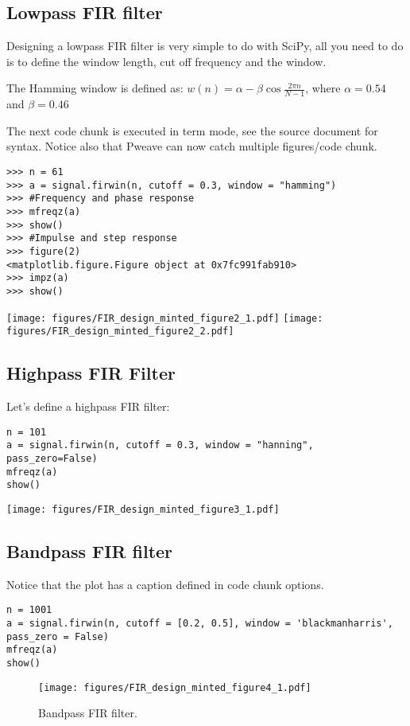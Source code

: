 \documentclass[a4paper,11pt,final]{article}
\begin{document}
\subsection{Lowpass FIR filter}

Designing a lowpass FIR filter is very simple to do with SciPy, all you
need to do is to define the window length, cut off frequency and the
window.

The Hamming window is defined as:
$w(n) = \alpha - \beta\cos\frac{2\pi n}{N-1}$, where $\alpha=0.54$ and
$\beta=0.46$

The next code chunk is executed in term mode, see the source document
for syntax. Notice also that Pweave can now catch multiple
figures/code chunk.


\begin{verbatim}
>>> n = 61
>>> a = signal.firwin(n, cutoff = 0.3, window = "hamming")
>>> #Frequency and phase response
>>> mfreqz(a)
>>> show()
>>> #Impulse and step response
>>> figure(2)
<matplotlib.figure.Figure object at 0x7fc991fab910>
>>> impz(a)
>>> show()

\end{verbatim}
\texttt{[image: figures/FIR\_design\_minted\_figure2\_1.pdf]}
\texttt{[image: figures/FIR\_design\_minted\_figure2\_2.pdf]}


\subsection{Highpass FIR Filter}

Let's define a highpass FIR filter:


\begin{verbatim}
n = 101
a = signal.firwin(n, cutoff = 0.3, window = "hanning",
pass_zero=False)
mfreqz(a)
show()
\end{verbatim}
\texttt{[image: figures/FIR\_design\_minted\_figure3\_1.pdf]}


\subsection{Bandpass FIR filter}

Notice that the plot has a caption defined in code chunk options.



\begin{verbatim}
n = 1001
a = signal.firwin(n, cutoff = [0.2, 0.5], window = 'blackmanharris',
pass_zero = False)
mfreqz(a)
show()
\end{verbatim}
\begin{figure}[htpb]
\center
\texttt{[image: figures/FIR\_design\_minted\_figure4\_1.pdf]}
\caption{Bandpass FIR filter.}
\label{fig:None}
\end{figure}
\end{document}
